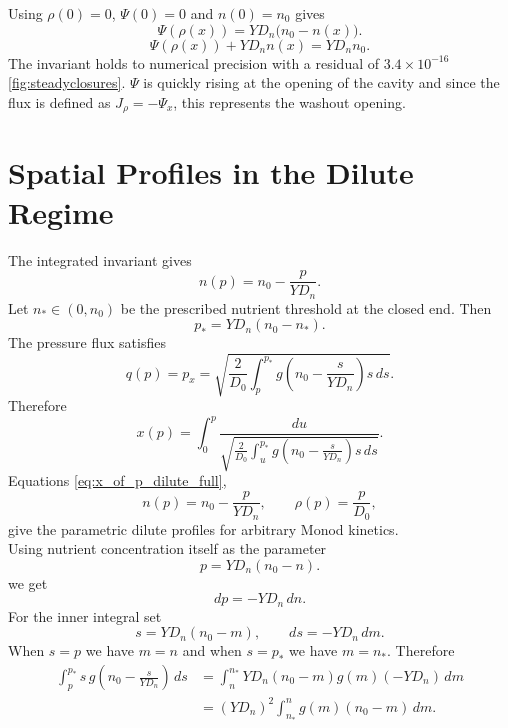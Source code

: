 \documentclass[11pt,a4paper]{report}
\begin{document}
Using $\rho(0)=0$, $\Psi(0)=0$ and $n(0)=n_0$ gives
\begin{equation}
	{
		\Psi(\rho(x))=YD_n\bigl(n_0-n(x)\bigr).
	}
	\label{eq:integrated_invariant_zero_opening}
\end{equation}
\begin{equation}
	{
		\Psi(\rho(x))+YD_n n(x)=YD_n n_0.
	}
	\label{eq:level_set_zero_opening}
\end{equation}
The invariant holds to numerical precision with a residual of $3.4\times 10^{-16}$ \ref{fig:steadyclosures}. $\Psi$ is quickly rising at the opening of the cavity and since the flux is defined as $J_\rho=-\Psi_x$, this represents the washout opening.
\section{Spatial Profiles in the Dilute Regime}
\label{dilute_profiles_corrected}	
The integrated invariant gives
\begin{equation}
	n(p)=n_0-\frac{p}{YD_n}.
\end{equation}	
Let $n_*\in(0,n_0)$ be the prescribed nutrient threshold at the closed
end.  Then
\begin{equation}
	p_*=YD_n(n_0-n_*).
\end{equation}
The pressure flux satisfies
\begin{equation}
	q(p)=p_x
	=
	\sqrt{
		\frac{2}{D_0}
		\int_p^{p_*}
		g\!\left(n_0-\frac{s}{YD_n}\right)s\,ds
	}.
	\label{eq:q_dilute_full_profile}
\end{equation}
Therefore
\begin{equation}
	x(p)
	=
	\int_0^p
	\frac{du}
	{
		\sqrt{
			\frac{2}{D_0}
			\int_u^{p_*}
			g\!\left(n_0-\frac{s}{YD_n}\right)s\,ds
		}
	}.
	\label{eq:x_of_p_dilute_full}
\end{equation}
Equations \eqref{eq:x_of_p_dilute_full},
\[
n(p)=n_0-\frac{p}{YD_n},
\qquad
\rho(p)=\frac{p}{D_0},
\]
give the parametric dilute profiles for arbitrary Monod kinetics.\\	
Using nutrient concentration itself as the parameter
\[
p=YD_n(n_0-n).
\]
we get
\[
dp=-YD_n\,dn.
\]
For the inner integral set
\[
s=YD_n(n_0-m),
\qquad
ds=-YD_n\,dm.
\]
When $s=p$ we have $m=n$ and when $s=p_*$ we have $m=n_*$.
Therefore
\begin{align}
	\int_p^{p_*}
	s\,g\!\left(n_0-\frac{s}{YD_n}\right)\,ds
	&=
	\int_n^{n_*}
	YD_n(n_0-m)g(m)(-YD_n)\,dm \\
	&=
	(YD_n)^2
	\int_{n_*}^{n} g(m)(n_0-m)\,dm.
	\label{eq:inner_integral_n_variable}
\end{align}
\end{document}
